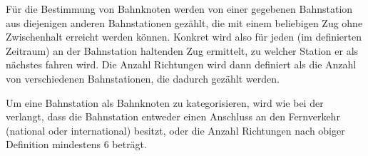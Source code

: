 Für die Bestimmung von Bahnknoten werden von einer gegebenen Bahnstation aus diejenigen anderen Bahnstationen gezählt, die mit einem beliebigen Zug ohne Zwischenhalt erreicht werden können.
Konkret wird also für jeden (im definierten Zeitraum) an der Bahnstation haltenden Zug ermittelt, zu welcher Station er als nächstes fahren wird.
Die Anzahl Richtungen wird dann definiert als die Anzahl von verschiedenen Bahnstationen, die dadurch gezählt werden.

Um eine Bahnstation als Bahnknoten zu kategorisieren, wird wie bei der  verlangt, dass die Bahnstation entweder einen Anschluss an den Fernverkehr (national oder international) besitzt, oder die Anzahl Richtungen nach obiger Definition mindestens 6 beträgt.